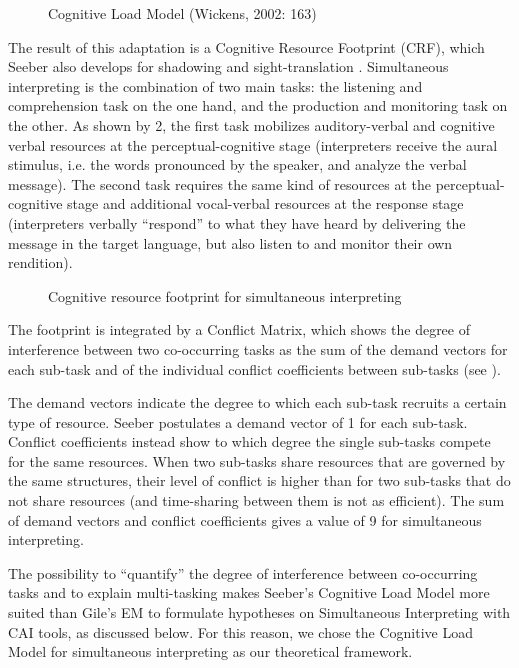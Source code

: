 \documentclass[output=paper]{langsci/langscibook}
\begin{document}
\begin{figure}
\caption{Cognitive Load Model (Wickens, 2002: 163)\label{fig:prandi:1}}
\end{figure}

The result of this adaptation is a Cognitive Resource Footprint (\textsc{CRF}), which Seeber also develops for shadowing and sight-translation \citep{Seeber2007}. Simultaneous interpreting is the combination of two main tasks: the listening and comprehension task on the one hand, and the production and monitoring task on the other. As shown by 2, the first task mobilizes auditory-verbal and cognitive verbal resources at the perceptual-cognitive stage (interpreters receive the aural stimulus, i.e. the words pronounced by the speaker, and analyze the verbal message). The second task requires the same kind of resources at the perceptual-cognitive stage and additional vocal-verbal resources at the response stage (interpreters verbally ``respond'' to what they have heard by delivering the message in the target language, but also listen to and monitor their own rendition).

\begin{figure}
	\caption{\label{fig:prandi:2}Cognitive resource footprint for simultaneous interpreting \citep[1385]{Seeber2007}}
\end{figure}
 
The footprint is integrated by a Conflict Matrix, which shows the degree of interference between two co-occurring tasks as the sum of the demand vectors for each sub-task and of the individual conflict coefficients between sub-tasks (see ). 

The demand vectors indicate the degree to which each sub-task recruits a certain type of resource. Seeber postulates a demand vector of 1 for each sub-task. Conflict coefficients instead show to which degree the single sub-tasks compete for the same resources. When two sub-tasks share resources that are governed by the same structures, their level of conflict is higher than for two sub-tasks that do not share resources (and time-sharing between them is not as efficient). The sum of demand vectors and conflict coefficients gives a value of 9 for simultaneous interpreting.

The possibility to ``quantify'' the degree of interference between co-occurring tasks and to explain multi-tasking makes Seeber’s Cognitive Load Model more suited than Gile’s EM to formulate hypotheses on Simultaneous Interpreting with \textsc{CAI} tools, as discussed below. For this reason, we chose the Cognitive Load Model for simultaneous interpreting as our theoretical framework.
\end{document}
